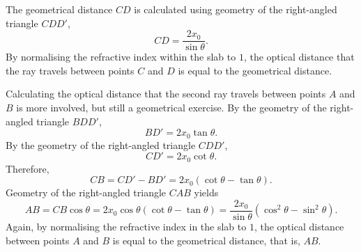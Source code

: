 	The geometrical distance $CD$ is calculated using geometry of the right-angled triangle $CDD'$,	\begin{equation}
	CD = \frac{2x_0}{\sin{\theta}}.
	\end{equation}
	By normalising the refractive index within the slab to $1$, the optical distance that the ray travels between points $C$ and $D$ is equal to the geometrical distance.
	
	Calculating the optical distance that the second ray travels between points $A$ and $B$ is more involved, but still a geometrical exercise. By the geometry of the right-angled triangle $BDD'$,
	\begin{equation}
	BD' = 2x_0\tan{\theta}.
	\end{equation}
	By the geometry of the right-angled triangle $CDD'$,
	\begin{equation}
	CD' = 2x_0\cot{\theta}.
	\end{equation}
	Therefore,
	\begin{equation}
	CB = CD' - BD' = 2x_0(\cot{\theta} - \tan{\theta}).
	\end{equation}
	Geometry of the right-angled triangle $CAB$ yields
	\begin{equation}
	AB = CB \cos{\theta} = 2x_0\cos{\theta}(\cot{\theta} - \tan{\theta}) = \frac{2x_0}{\sin{\theta}}(\cos^2{\theta} - \sin^2{\theta}).
	\end{equation}
	Again, by normalising the refractive index in the slab to $1$, the optical distance between points $A$ and $B$ is equal to the geometrical distance, that is, $AB$.
	
